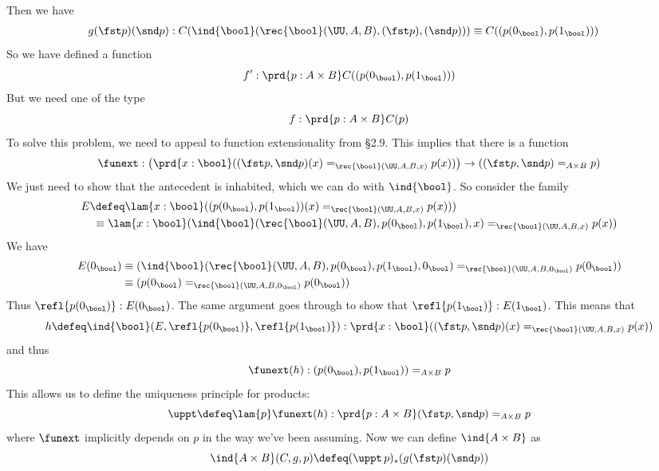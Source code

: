 Then we have
\begin{align*}
  g(\fst p)(\snd p) 
  &: C(\ind{\bool}(\rec{\bool}(\UU, A, B), (\fst p), (\snd p)))
  \equiv 
  C((p(0_{\bool}), p(1_{\bool})))
\end{align*}
So we have defined a function
\[
  f' : \prd{p : A \times B} C((p(0_{\bool}), p(1_{\bool})))
\]
But we need one of the type
\[
  f : \prd{p : A \times B} C(p)
\]
To solve this problem, we need to appeal to function extensionality from \S2.9.
This implies that there is a function
\[
  \funext : 
    \left(\prd{x:\bool} ((\fst p, \snd p)(x) =_{\rec{\bool}(\UU, A, B, x)} p(x))\right)
    \to 
    ((\fst p, \snd p) =_{A \times B} p)
\]
We just need to show that the antecedent is inhabited, which we can do with
$\ind{\bool}$.  So consider the family
\begin{align*}
  E &\defeq 
  \lam{x : \bool} 
  ((p(0_{\bool}), p(1_{\bool}))(x) =_{\rec{\bool}(\UU, A, B, x)}  p(x)))
  \\&\phantom{:}\equiv
  \lam{x : \bool} 
  (\ind{\bool}(\rec{\bool}(\UU, A, B), p(0_{\bool}), p(1_{\bool}), x)
  =_{\rec{\bool}(\UU, A, B, x)} p(x))
\end{align*}
We have
\begin{align*}
  E(0_{\bool})
  &\equiv
  (\ind{\bool}(\rec{\bool}(\UU, A, B),
  p(0_{\bool}), p(1_{\bool}), 0_{\bool}) =_{\rec{\bool}(\UU, A, B, 0_{\bool})}
  p(0_{\bool}))
  \\&\equiv
  (p(0_{\bool}) =_{\rec{\bool}(\UU, A, B, 0_{\bool})} p(0_{\bool}))
\end{align*}
Thus $\refl{p(0_{\bool})} : E(0_{\bool})$.  The same argument goes through to
show that $\refl{p(1_{\bool})} : E(1_{\bool})$.  This means that
\[
  h \defeq
  \ind{\bool}(E, \refl{p(0_{\bool})}, \refl{p(1_{\bool})})
  :
  \prd{x : \bool} ((\fst p, \snd p)(x) =_{\rec{\bool}(\UU, A, B, x)} p(x))
\]
and thus
\[
  \funext(h) 
  : 
  (p(0_{\bool}), p(1_{\bool}))
  =_{A \times B} 
  p 
\]
This allows us to define the uniqueness principle for products:
\[
\uppt \defeq \lam{p}\funext(h)  
: \prd{p:A \times B} 
(\fst p, \snd p)
=_{A \times B} 
p 
\]
where $\funext$ implicitly depends on $p$ in the way we've been assuming.
Now we can define $\ind{A\times B}$ as
\[
  \ind{A\times B}(C, g, p) \defeq (\uppt\, p)_{*}(g(\fst p)(\snd p))
\]
